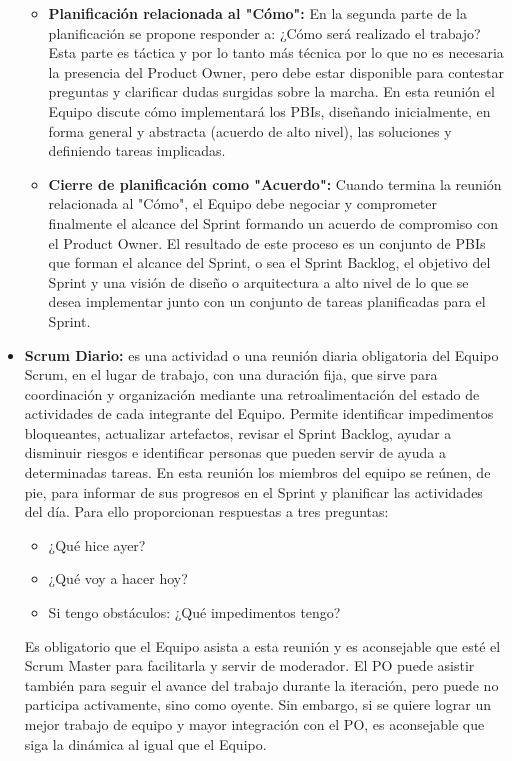 \begin{itemize}
\begin{itemize}
\item \textbf{Planificación relacionada al "Cómo":} En la segunda parte de la planificación se propone responder a: ¿Cómo será realizado el trabajo? Esta parte es táctica y por lo tanto más técnica por lo que no es necesaria la presencia del Product Owner, pero debe estar disponible para contestar preguntas y clarificar dudas surgidas sobre la marcha. En esta reunión el Equipo discute cómo implementará los PBIs, diseñando inicialmente, en forma general y abstracta (acuerdo de alto nivel), las soluciones y definiendo tareas implicadas. 

\item \textbf{Cierre de planificación como "Acuerdo":} Cuando termina la reunión relacionada al "Cómo", el Equipo debe negociar y comprometer finalmente el alcance del Sprint formando un acuerdo de compromiso con el Product Owner. El resultado de este proceso es un conjunto de PBIs que forman el alcance del Sprint, o sea el Sprint Backlog, el objetivo del Sprint y una visión de diseño o arquitectura a alto nivel de lo que se desea implementar junto con un conjunto de tareas planificadas para el Sprint.

\end{itemize}

\item \textbf{Scrum Diario:} es una actividad o una reunión diaria obligatoria del Equipo Scrum, en el lugar de trabajo, con una duración fija, que sirve para coordinación y organización mediante una retroalimentación del estado de actividades de cada integrante del Equipo. Permite identificar impedimentos bloqueantes, actualizar artefactos, revisar el Sprint Backlog, ayudar a disminuir riesgos e identificar personas que pueden servir de ayuda a determinadas tareas. En esta reunión los miembros del equipo se reúnen, de pie, para informar de sus progresos en el Sprint y planificar las actividades del día. Para ello proporcionan respuestas a tres preguntas:

\begin{itemize}
\item{¿Qué hice ayer?}
\item{¿Qué voy a hacer hoy?}
\item{Si tengo obstáculos: ¿Qué impedimentos tengo?}
\end{itemize}

Es obligatorio que el Equipo asista a esta reunión y es aconsejable que esté el Scrum Master para facilitarla y servir de moderador. El PO puede asistir también para seguir el avance del trabajo durante la iteración, pero puede no participa activamente, sino como oyente. Sin embargo, si se quiere lograr un mejor trabajo de equipo y mayor integración con el PO, es aconsejable que siga la dinámica al igual que el Equipo.


\end{itemize}
